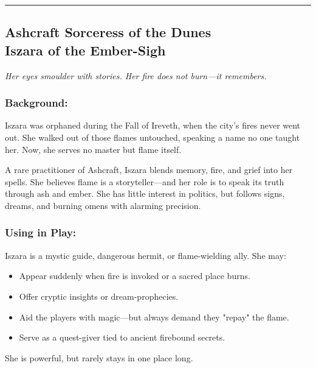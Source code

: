 \vspace{.5\baselineskip}
\hrule
\vspace{.5\baselineskip}

\subsection{{\small Ashcraft Sorceress of the Dunes}\\ Iszara of the Ember-Sigh}
\label{npc:iszara-ember-sigh}

\emph{Her eyes smoulder with stories. Her fire does not burn—it remembers.}
\vspace{.5\baselineskip}

\begin{paracol}{3}
    \subsubsection*{Background:}
    Iszara was orphaned during the Fall of Ireveth, when the city’s fires never went out. She walked out of those flames untouched, speaking a name no one taught her. Now, she serves no master but flame itself.

    A rare practitioner of Ashcraft, Iszara blends memory, fire, and grief into her spells. She believes flame is a storyteller—and her role is to speak its truth through ash and ember. She has little interest in politics, but follows signs, dreams, and burning omens with alarming precision.

    \switchcolumn
    \subsubsection*{Using in Play:}
    Iszara is a mystic guide, dangerous hermit, or flame-wielding ally. She may:
    \begin{itemize}\raggedright
        \item Appear suddenly when fire is invoked or a sacred place burns.
        \item Offer cryptic insights or dream-prophecies.
        \item Aid the players with magic—but always demand they "repay" the flame.
        \item Serve as a quest-giver tied to ancient firebound secrets.
    \end{itemize}

    She is powerful, but rarely stays in one place long.

    \switchcolumn

\end{paracol}

